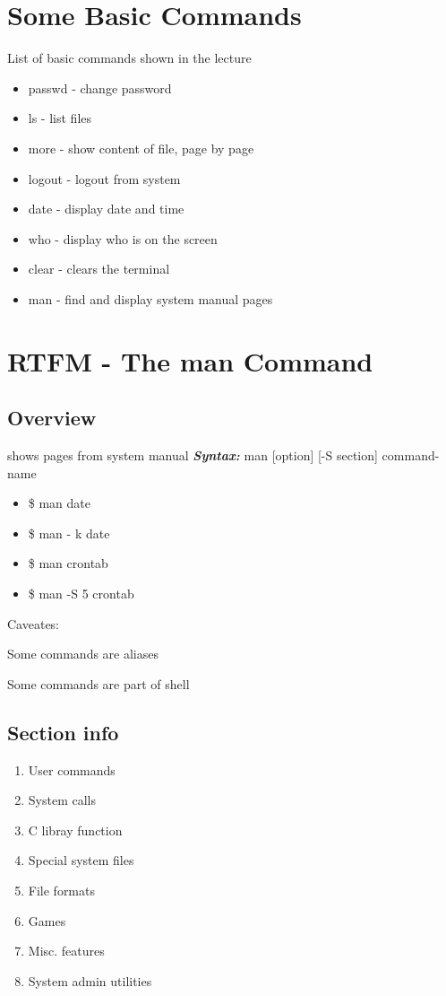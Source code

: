 \documentclass{report}
\author{\huge{Matt Warner}}
\date{\huge{}}
\begin{document}
  \maketitle
  \section{Some Basic Commands}
  List of basic commands shown in the lecture
  \begin{mdframed}
  \begin{itemize}
    \item passwd - change password 
    \item ls - list files
    \item more - show content of file, page by page
    \item logout - logout from system
    \item date - display date and time
    \item who - display who is on the screen
    \item clear - clears the terminal
    \item man - find and display system manual pages
  \end{itemize}
\end{mdframed}
  \section{RTFM - The man Command}
  \subsection{Overview}
  shows pages from system manual
  \bigbreak \noindent
  \textit{\textbf{Syntax:}} man [option] [-S section] command-name
  \begin{itemize}
    \item \$ man date 
    \item \$ man - k date
    \item \$ man crontab
    \item \$ man -S 5 crontab
  \end{itemize}
  \bigbreak \noindent
  Caveates: \vspace{1mm}

  Some commands are aliases \vspace{1mm}

  Some commands are part of shell
  \subsection{Section info}
  \begin{enumerate}
    \item User commands 
    \item System calls
    \item C libray function
    \item Special system files
    \item File formats
    \item Games
    \item Misc. features
    \item System admin utilities
  \end{enumerate} 
  \newpage
\end{document}
